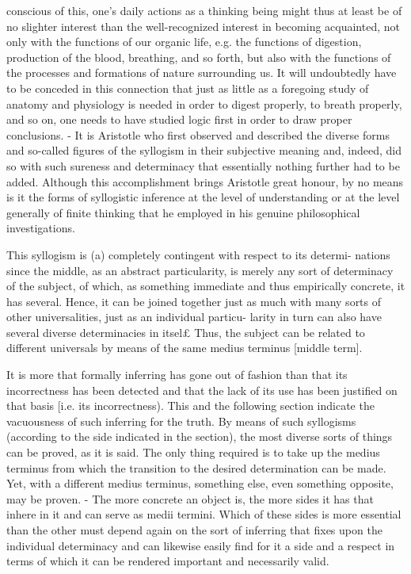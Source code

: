conscious of this, one's daily actions as a thinking being might thus at least be
of no slighter interest than the well-recognized interest in becoming acquainted,
not only with the functions of our organic life, e.g. the functions of digestion,
production of the blood, breathing, and so forth, but also with the functions of
the processes and formations of nature surrounding us. It will undoubtedly have
to be conceded in this connection that just as little as a foregoing study of anatomy
and physiology is needed in order to digest properly, to breath properly, and so
on, one needs to have studied logic first in order to draw proper conclusions. - It
is Aristotle who first observed and described the diverse forms and so-called figures
of the syllogism in their subjective meaning and, indeed, did so with such sureness
and determinacy that essentially nothing further had to be added. Although this
accomplishment brings Aristotle great honour, by no means is it the forms of
syllogistic inference at the level of understanding or at the level generally of finite
thinking that he employed in his genuine philosophical investigations.

This syllogism is (a) completely contingent with respect to its determi-
nations since the middle, as an abstract particularity, is merely any sort of
determinacy of the subject, of which, as something immediate and thus
empirically concrete, it has several. Hence, it can be joined together just as
much with many sorts of other universalities, just as an individual particu-
larity in turn can also have several diverse determinacies in itsel£ Thus, the
subject can be related to different universals by means of the same medius
terminus [middle term].

    It is more that formally inferring has gone out of fashion than that
    its incorrectness has been detected and that the lack of its use has
    been justified on that basis [i.e. its incorrectness). This and the
    following section indicate the vacuousness of such
    inferring for the truth.
    By means of such syllogisms (according to the side indicated in
    the section), the most diverse sorts of things can be proved, as it is
    said. The only thing required is to take up the medius terminus from
    which the transition to the desired determination can be made. Yet,
    with a different medius terminus, something else, even something
    opposite, may be proven. - The more concrete an object is, the more
    sides it has that inhere in it and can serve as medii termini. Which of
    these sides is more essential than the other must depend again on the
    sort of inferring that fixes upon the individual determinacy and can
    likewise easily find for it a side and a respect in terms of which it can
    be rendered important and necessarily valid.


